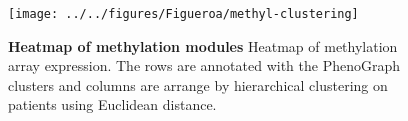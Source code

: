 \documentclass{article}
\begin{document}
\begin{figure}[htbp]
\begin{center}
\texttt{[image: ../../figures/Figueroa/methyl-clustering]}
\caption[Heatmap of methylation modules]{\textbf{Heatmap of methylation modules} Heatmap of methylation array expression. The rows are annotated with the PhenoGraph clusters and columns are arrange by hierarchical clustering on patients using Euclidean distance. }
\label{heatmap}
\end{center}
\end{figure}


\clearpage

 

\end{document}
